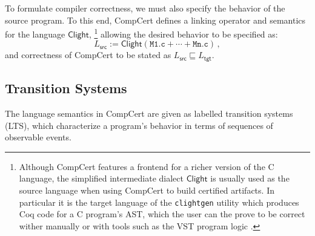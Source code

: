 \documentclass[sigplan,10pt,review,anonymous]{acmart}
\newcommand{\kw}[1]{\ensuremath{ \mathsf{#1} }}
\begin{document}
To formulate compiler correctness,
we must also specify the behavior of the source program.
To this end,
CompCert defines a linking operator
and semantics
for the language $\kw{Clight}$,%
\footnote{
  Although CompCert features a frontend for a richer version
  of the C language,
  the simplified intermediate dialect \kw{Clight}
  is usually used as the source language
  when using CompCert to build certified artifacts.
  In particular it is the target language of the
  \texttt{clightgen} utility which
  produces Coq code for a C program's AST,
  which the user can the prove to be correct
  wither manually or with tools such as the VST program logic
  \cite{vst}.
}
allowing the desired behavior to be specified as:
\[
    L_\kw{src} :=
    \kw{Clight}(\texttt{M1.c} + \cdots + \texttt{Mn.c}) \,,
\]
and correctness of CompCert
to be stated as $L_\kw{src} \sqsubseteq L_\kw{tgt}$.


\subsection{Transition Systems} \label{sec:sem:closed} %

The language semantics in CompCert are
given as labelled transition systems (LTS),
which characterize a program's behavior in terms of
sequences of observable events.
\end{document}
